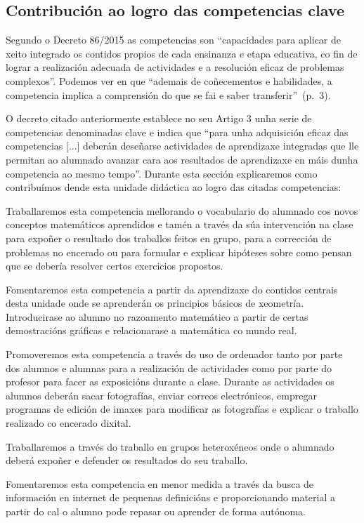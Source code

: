 \subsection{Contribución ao logro das competencias clave}\label{sec:competencias}
Segundo o Decreto 86/2015 as competencias son ``capacidades para aplicar de xeito integrado os contidos propios de cada ensinanza e etapa educativa, co fin de lograr a realización adecuada de actividades e a resolución eficaz de problemas complexos''. Podemos ver en  que ``ademais de coñecementos e habilidades, a competencia implica a comprensión do que se fai e saber transferir''~(p.~3).

O decreto citado anteriormente establece no seu Artigo 3 unha serie de competencias denominadas clave e indica que ``para unha adquisición eficaz das competencias [...] deberán deseñarse actividades de aprendizaxe integradas que lle permitan ao alumnado avanzar cara aos resultados de aprendizaxe en máis dunha competencia ao mesmo tempo''. Durante esta sección explicaremos como contribuímos dende esta unidade didáctica ao logro das citadas competencias:

\begin{description}[]
    \item[Comunicación Lingüística (CCL)] Traballaremos esta competencia mellorando o vocabulario do alumnado cos novos conceptos matemáticos aprendidos e tamén a través da súa intervención na clase para expoñer o resultado dos traballos feitos en grupo, para a corrección de problemas no encerado ou para formular e explicar hipóteses sobre como pensan que se debería resolver certos exercicios propostos.
    \item[Comp. matemática e comp. básicas en ciencia e tecnoloxía (CMCCT)] Fomentaremos esta competencia a partir da aprendizaxe do contidos centrais desta unidade onde se aprenderán os principios básicos de xeometría. Introducirase ao alumno no razoamento matemático a partir de certas demostracións gráficas e relacionarase a matemática co mundo real.
    \item[Comp. Dixital (CD)] Promoveremos esta competencia a través do uso de ordenador tanto por parte dos alumnos e alumnas para a realización de actividades como por parte do profesor para facer as exposicións durante a clase. Durante as actividades os alumnos deberán sacar fotografías, enviar correos electrónicos, empregar programas de edición de imaxes para modificar as fotografías e explicar o traballo realizado co encerado dixital.
    \item[Comp. sociais e cívicas (CSC)] Traballaremos a través do traballo en grupos heteroxéneos onde o alumnado deberá expoñer e defender os resultados do seu traballo.
    \item[Aprender a aprender (CAA)] Fomentaremos esta competencia en menor medida a través da busca de información en internet de pequenas definicións e proporcionando material a partir do cal o alumno pode repasar ou aprender de forma autónoma.
\end{description}


